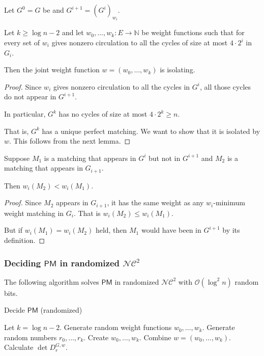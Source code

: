 \documentclass{beamer}
\theoremstyle{remark}
\newcommand{\nn}{\mathbb{N}}
\newcommand{\dpm}{\mathsf{PM}}
\newcommand{\nc}{{\mathcal{NC}}}
\newcommand{\OO}{\mathcal{O}}
\begin{document}
\begin{frame}[allowframebreaks]
  \begin{theorem}
    Let $G^0 = G$ be and $G^{i+1} = {\left(G^{i}\right)}_{w_i}$.

    Let $k \ge \log n - 2$ and let $w_0, \ldots, w_k : E \to \nn$ be weight functions
    such that for every set of $w_i$ gives nonzero circulation to all the
    cycles of size at most $4 \cdot 2^i$ in $G_{i}$.

    Then the joint weight function $w = (w_0, \ldots, w_k)$ is isolating.
  \end{theorem}

  \begin{proof}
    Since $w_i$ gives nonzero circulation to all the cycles
    in $G^i$, all those cycles do not appear in $G^{i+1}$.

    In particular, $G^k$ has no cycles of size at most $4 \cdot 2^k \ge n$.

    That is, $G^k$ has a unique perfect matching.
    We want to show that it is isolated by $w$.
    This follows from the next lemma.
  \end{proof}

  \begin{lemma}
    Suppose $M_1$ is a matching that appears in $G^i$ but not in $G^{i+1}$ and $M_2$ is a matching
    that appears in $G_{i+1}$.

    Then $w_i(M_2) < w_i(M_1)$.
  \end{lemma}

  \begin{proof}
    Since $M_2$ appears in $G_{i+1}$, it has
    the same weight as any $w_i$-minimum weight matching in $G_i$.
    That is $w_{i}(M_2) \le w_i(M_1)$.

    But if $w_i(M_1) = w_i(M_2)$ held, then $M_1$ would have been in $G^{i+1}$
    by its definition.
  \end{proof}

\end{frame}

\begin{frame}
  \frametitle{Deciding $\dpm$ in randomized $\nc^2$}
  The following algorithm solves $\dpm$ in randomized $\nc^2$
  with $\OO(\log^2 n)$ random bits.

  \begin{algorithm}[H]
    \caption{Decide $\dpm$ (randomized)}
    \begin{algorithmic}
      \STATE Let $k = \log n - 2$.
      \STATE Generate random weight functions $w_0, \ldots, w_k$.
      \STATE Generate random numbers $r_0, \ldots, r_k$.
      \STATE Create $w_0, \ldots, w_k$.
      \STATE Combine $w = (w_0, \ldots, w_k)$.
      \STATE Calculate $\det D_r^{G, w}$.
    \end{algorithmic}
  \end{algorithm}
\end{frame}
\end{document}
